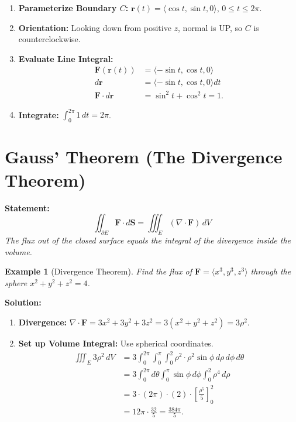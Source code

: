 \documentclass[11pt]{article}
\newtheorem{example}{Example}[section]
\newcommand{\F}{\mathbf{F}}
\newcommand{\divg}{\nabla \cdot}
\begin{document}
\begin{enumerate}
    \item \textbf{Parameterize Boundary $C$:} $\mathbf{r}(t) = \langle \cos t, \sin t, 0 \rangle$, $0 \le t \le 2\pi$.
    \item \textbf{Orientation:} Looking down from positive $z$, normal is UP, so $C$ is counterclockwise.
    \item \textbf{Evaluate Line Integral:}
    \begin{align*}
        \F(\mathbf{r}(t)) &= \langle -\sin t, \cos t, 0 \rangle \\
        d\mathbf{r} &= \langle -\sin t, \cos t, 0 \rangle dt \\
        \F \cdot d\mathbf{r} &= \sin^2 t + \cos^2 t = 1.
    \end{align*}
    \item \textbf{Integrate:} $\int_0^{2\pi} 1 \, dt = 2\pi$.
\end{enumerate}

\section{Gauss' Theorem (The Divergence Theorem)}

\textbf{Statement:}
\[
\iint_{\partial E} \F \cdot d\mathbf{S} = \iiint_E (\divg \F) \, dV
\]
\textit{The flux out of the closed surface equals the integral of the divergence inside the volume.}

\begin{example}[Divergence Theorem]
Find the flux of $\F = \langle x^3, y^3, z^3 \rangle$ through the sphere $x^2+y^2+z^2=4$.
\end{example}

\textbf{Solution:}
\begin{enumerate}
    \item \textbf{Divergence:} $\divg \F = 3x^2 + 3y^2 + 3z^2 = 3(x^2+y^2+z^2) = 3\rho^2$.
    \item \textbf{Set up Volume Integral:} Use spherical coordinates.
    \begin{align*}
        \iiint_E 3\rho^2 \, dV &= 3 \int_0^{2\pi} \int_0^\pi \int_0^2 \rho^2 \cdot \rho^2 \sin\phi \, d\rho \, d\phi \, d\theta \\
        &= 3 \int_0^{2\pi} d\theta \int_0^\pi \sin\phi \, d\phi \int_0^2 \rho^4 \, d\rho \\
        &= 3 \cdot (2\pi) \cdot (2) \cdot \left[ \frac{\rho^5}{5} \right]_0^2 \\
        &= 12\pi \cdot \frac{32}{5} = \frac{384\pi}{5}.
    \end{align*}
\end{enumerate}
\end{document}
